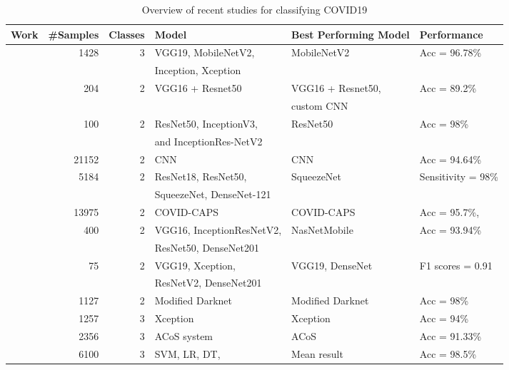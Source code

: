 
\begin{table}[htbp]
\caption{\label{tbl:related}Overview of recent studies for classifying COVID19}
\begin{center}
\begin{adjustbox}{angle=90}
\begin{tabular}{|l|r|r|l|l|l|}%
\hline
Work &  \#Samples &  Classes &  Model &  Best Performing Model &   Performance \\
\hline
\hline
~\cite{35apostolopoulos2020covid} & 1428 &    3 & VGG19, MobileNetV2, &   MobileNetV2 & Acc = 96.78\%  \\

      &      &    & Inception, Xception &    &   \\
\hline
~\cite{36hall2020finding} &  204 &    2 &   VGG16 + Resnet50 & VGG16 + Resnet50, &    Acc = 89.2\% \\

     &    &      &                        &   custom CNN &      \\
\hline           
~\cite{37narin2021automatic} &  100 &    2 &   ResNet50, InceptionV3, &  ResNet50 &  Acc = 98\% \\

&    &      &   and InceptionRes-NetV2 &   &    \\
\hline
~\cite{38tang2020automated} &    21152 &    2 &    CNN &   CNN &   Acc = 94.64\% \\
\hline
~\cite{39minaee2020deep}  & 5184 &    2 &   ResNet18, ResNet50, &    SqueezeNet & Sensitivity = 98\%\\

  &   &      &     SqueezeNet, DenseNet-121 &      &  \\
\hline
~\cite{40afshar2020covid}  &    13975 &    2 & COVID-CAPS &    COVID-CAPS &   Acc = 95.7\%, \\
\hline
~\cite{41ahsan2020covid}  &  400 &    2 & VGG16, InceptionResNetV2, &  NasNetMobile &   Acc = 93.94\% \\

  &    &      &  ResNet50, DenseNet201  &    &     \\
\hline
~\cite{42hemdan2020covidx}  &   75 &    2 & VGG19, Xception,  &   VGG19, DenseNet &   F1 scores = 0.91 \\

  &     &      &  ResNetV2, DenseNet201 &     &    \\
\hline
~\cite{43ozturk2020automated}  & 1127 &    2 &   Modified Darknet &  Modified Darknet &  Acc = 98\% \\
\hline
~\cite{44khan2020coronet}  & 1257 &    3 &   Xception &  Xception &  Acc = 94\% \\
\hline
~\cite{45chandra2021coronavirus} & 2356 &    3 &    ACoS system &  ACoS &   Acc = 91.33\% \\
\hline
~\cite{46sekeroglu2020covid19} & 6100 &    3 & SVM, LR, DT, &   Mean result &    Acc = 98.5\% \\


\end{tabular}
\end{adjustbox}
\end{center}
\end{table}
